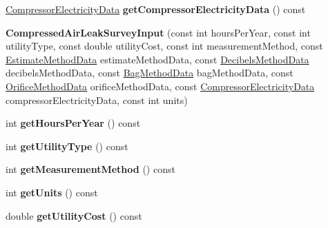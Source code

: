 \begin{DoxyCompactItemize}
\item 
\mbox{\label{class_compressed_air_leak_survey_input_abb548b44e689a5aae7ffe4ab3acb2234}} 
\hyperlink{class_compressor_electricity_data}{Compressor\+Electricity\+Data} {\bfseries get\+Compressor\+Electricity\+Data} () const
\item 
\mbox{\label{class_compressed_air_leak_survey_input_ad39d455788d74edeb8b285e1e6a72408}} 
{\bfseries Compressed\+Air\+Leak\+Survey\+Input} (const int hours\+Per\+Year, const int utility\+Type, const double utility\+Cost, const int measurement\+Method, const \hyperlink{class_estimate_method_data}{Estimate\+Method\+Data} estimate\+Method\+Data, const \hyperlink{class_decibels_method_data}{Decibels\+Method\+Data} decibels\+Method\+Data, const \hyperlink{class_bag_method_data}{Bag\+Method\+Data} bag\+Method\+Data, const \hyperlink{class_orifice_method_data}{Orifice\+Method\+Data} orifice\+Method\+Data, const \hyperlink{class_compressor_electricity_data}{Compressor\+Electricity\+Data} compressor\+Electricity\+Data, const int units)
\item 
\mbox{\label{class_compressed_air_leak_survey_input_ad8bbb597ffa0ff210c11e47c493c6c6c}} 
int {\bfseries get\+Hours\+Per\+Year} () const
\item 
\mbox{\label{class_compressed_air_leak_survey_input_af4cabd84565e5481c81edbd5116e044c}} 
int {\bfseries get\+Utility\+Type} () const
\item 
\mbox{\label{class_compressed_air_leak_survey_input_a77d57d1517f35d5397e8d6160a9cbe4a}} 
int {\bfseries get\+Measurement\+Method} () const
\item 
\mbox{\label{class_compressed_air_leak_survey_input_a72e81855b93c1bdc1e96de8c77cff98a}} 
int {\bfseries get\+Units} () const
\item 
\mbox{\label{class_compressed_air_leak_survey_input_aef778b2fd835f951a24fd314da054ffe}} 
double {\bfseries get\+Utility\+Cost} () const
\item 

\end{DoxyCompactItemize}
